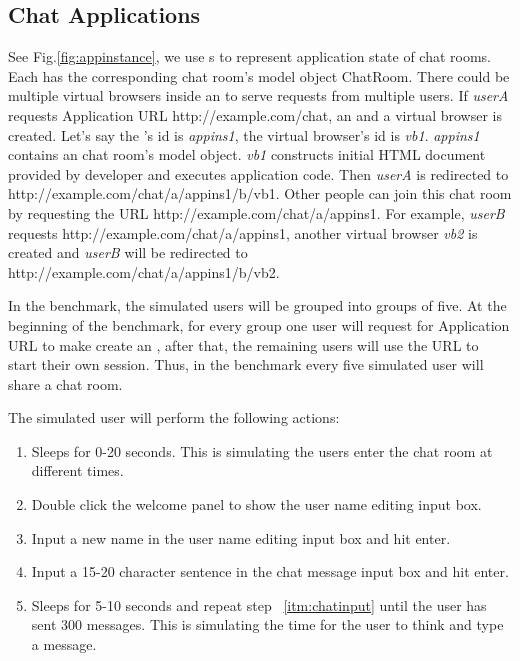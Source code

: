 \clickthroughput{}
\clicklatency{}

\clickwaitthroughput{}
\clickwaitlatency{}

\subsection{Chat Applications}
See Fig.\ref{fig:appinstance},
we use \appins{}s to represent application state of chat rooms.
Each \appins{} has the corresponding chat room's model object ChatRoom.
There could be multiple virtual browsers inside an \appins{} to  
serve requests from multiple users.
If \emph{userA} requests Application URL http://example.com/chat,
an \appins{} and a virtual browser is created.
Let's say the \appins{}'s id is \emph{appins1},
the virtual browser's id is \emph{vb1}.
\emph{appins1} contains an chat room's model object.
\emph{vb1} constructs initial HTML document provided by developer and 
executes application \js{} code.
Then \emph{userA} is redirected to http://example.com/chat/a/appins1/b/vb1.
Other people can join this chat room by requesting the \appins{} URL
http://example.com/chat/a/appins1.
For example, \emph{userB} requests http://example.com/chat/a/appins1,
another virtual browser \emph{vb2} is created and \emph{userB} will be
redirected to http://example.com/chat/a/appins1/b/vb2. 

In the benchmark, 
the simulated users will be grouped into groups of five.
At the beginning of the benchmark, 
for every group one user will request for Application URL to make 
\cb{} create an \appins{},
after that, the remaining users will use the \appins{} URL to start
their own session.
Thus, in the benchmark every five simulated user will share a chat room.

The simulated user will perform the following actions:
\begin{enumerate}
\item Sleeps for 0-20 seconds. This is simulating the users enter the 
chat room at different times.

\item Double click the welcome panel to show the user name editing input box.

\item Input a new name in the user name editing input box and hit enter.

\item \label{itm:chatinput} Input a 15-20 character sentence in the chat message input box and hit enter.

\item Sleeps for 5-10 seconds and repeat step ~\ref{itm:chatinput} 
until the user has sent 300 messages. 
This is simulating the time for the user to think and type a message.

\end{enumerate}


